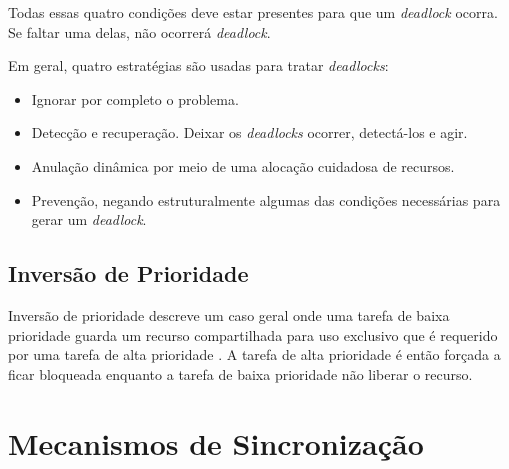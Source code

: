 Todas essas quatro condições deve estar presentes para que um
\textit{deadlock} ocorra. Se faltar uma delas, não ocorrerá
\textit{deadlock}.

Em geral, quatro estratégias são usadas para tratar \textit{deadlocks}:

\begin{itemize}
\item Ignorar por completo o problema.
\item Detecção e recuperação. Deixar os \textit{deadlocks} ocorrer,
detectá-los e agir.
\item Anulação dinâmica por meio de uma alocação cuidadosa de recursos.
\item Prevenção, negando estruturalmente algumas das condições necessárias
para gerar um \textit{deadlock}.
\end{itemize}

\subsection{Inversão de Prioridade}

Inversão de prioridade descreve um caso geral onde uma tarefa de baixa
prioridade guarda um recurso compartilhada para uso exclusivo que é
requerido por uma tarefa de alta prioridade \cite{intel}. A tarefa de alta
prioridade é então forçada a ficar bloqueada enquanto a tarefa de baixa
prioridade não liberar o recurso.

%
%
%

\section{Mecanismos de Sincronização}
\label{sec:mecanismo}

